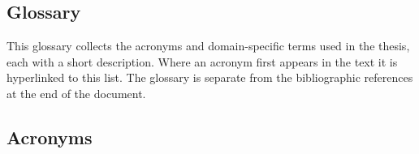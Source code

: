 
\begin{onehalfspacing}

\chapter*{Glossary}
\label{ch:glossary}
\hypertarget{glossary}{}

This glossary collects the acronyms and domain-specific terms used in the thesis, each with a short description. Where an acronym first appears in the text it is hyperlinked to this list. The glossary is separate from the bibliographic references at the end of the document.

\section*{Acronyms}


\end{onehalfspacing}
